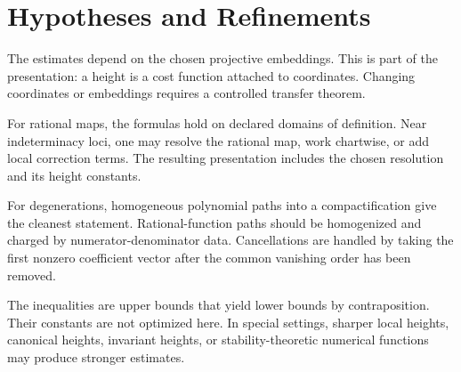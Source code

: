 \documentclass[11pt]{article}
\begin{document}
\section{Hypotheses and Refinements}

The estimates depend on the chosen projective embeddings. This is part of the presentation: a height is a cost function attached to coordinates. Changing coordinates or embeddings requires a controlled transfer theorem.

For rational maps, the formulas hold on declared domains of definition. Near indeterminacy loci, one may resolve the rational map, work chartwise, or add local correction terms. The resulting presentation includes the chosen resolution and its height constants.

For degenerations, homogeneous polynomial paths into a compactification give the cleanest statement. Rational-function paths should be homogenized and charged by numerator-denominator data. Cancellations are handled by taking the first nonzero coefficient vector after the common vanishing order has been removed.

The inequalities are upper bounds that yield lower bounds by contraposition. Their constants are not optimized here. In special settings, sharper local heights, canonical heights, invariant heights, or stability-theoretic numerical functions may produce stronger estimates.
\end{document}
